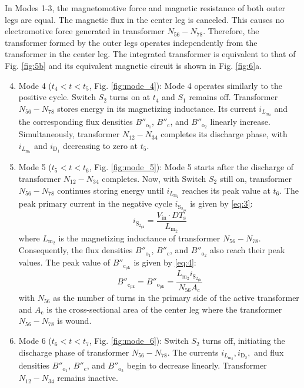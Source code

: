 \documentclass[lettersize,journal]{IEEEtran}
\begin{document}
In Modes 1-3, the magnetomotive force and magnetic resistance of both outer legs are equal. The magnetic flux in the center leg is canceled. This causes no electromotive force generated in transformer $N_{56}-N_{78}$. Therefore, the transformer formed by the outer legs operates independently from the transformer in the center leg. The integrated transformer is equivalent to that of Fig. \ref{fig:5b} and its equivalent magnetic circuit is shown in Fig. \ref{fig:6}a.

\begin{enumerate}
    \setcounter{enumi}{3} %
    \item Mode 4 ($t_4 < t < t_5$, Fig. \ref{fig:mode_4}): Mode 4 operates similarly to the positive cycle. Switch $S_2$ turns on at $t_4$ and $S_1$ remains off. Transformer $N_{56}-N_{78}$ stores energy in its magnetizing inductance. Its current $i_{L_{\mathrm{m}_2}}$ and the corresponding flux densities $B''_{\mathrm{o}_1}$, $B''_{\mathrm{c}}$, and $B''_{\mathrm{o}_2}$ linearly increase. Simultaneously, transformer $N_{12}-N_{34}$ completes its discharge phase, with $i_{L_{\mathrm{m}_1}}$ and $i_{\mathrm{D}_1}$ decreasing to zero at $t_5$.

    \item Mode 5 ($t_5 < t < t_6$, Fig. \ref{fig:mode_5}): Mode 5 starts after the discharge of transformer $N_{12}-N_{34}$ completes. Now, with Switch $S_2$ still on, transformer $N_{56}-N_{78}$ continues storing energy until $i_{L_{\mathrm{m}_2}}$ reaches its peak value at $t_6$. The peak primary current in the negative cycle $i_{\mathrm{S}_{2_{\mathrm{pk}}}}$ is given by \eqref{eq:3}:
    \begin{equation}
    \label{eq:3}
    i_{\mathrm{S}_{2_{\mathrm{pk}}}} = \frac{V_{\mathrm{in}} \cdot DT_{\mathrm{s}}}{L_{\mathrm{m}_2}}
    \end{equation}
    where $L_{\mathrm{m}_2}$ is the magnetizing inductance of transformer $N_{56}-N_{78}$. Consequently, the flux densities $B''_{\mathrm{o}_1}$, $B''_{\mathrm{c}}$, and $B''_{\mathrm{o}_2}$ also reach their peak values. The peak value of $B''_{\mathrm{c}_{\mathrm{pk}}}$ is given by \eqref{eq:4}:
    \begin{equation}
    \label{eq:4}
    B''_{\mathrm{c}_{\mathrm{pk}}} = B''_{\mathrm{o}_{\mathrm{pk}}} = \frac{L_{\mathrm{m}_2} i_{\mathrm{S}_{2_{\mathrm{pk}}}}}{N_{56} A_{\mathrm{c}}}
    \end{equation}
    with $N_{56}$ as the number of turns in the primary side of the active transformer and $A_{\mathrm{c}}$ is the cross-sectional area of the center leg where the transformer $N_{56}-N_{78}$ is wound.

    \item Mode 6 ($t_6 < t < t_7$, Fig. \ref{fig:mode_6}): Switch $S_2$ turns off, initiating the discharge phase of transformer $N_{56}-N_{78}$. The currents $i_{L_{\mathrm{m}_2}}, i_{\mathrm{D}_2},$ and flux densities $B''_{\mathrm{o}_1}$, $B''_{\mathrm{c}}$, and $B''_{\mathrm{o}_2}$ begin to decrease linearly. Transformer $N_{12}-N_{34}$ remains inactive.
\end{enumerate}
\end{document}
